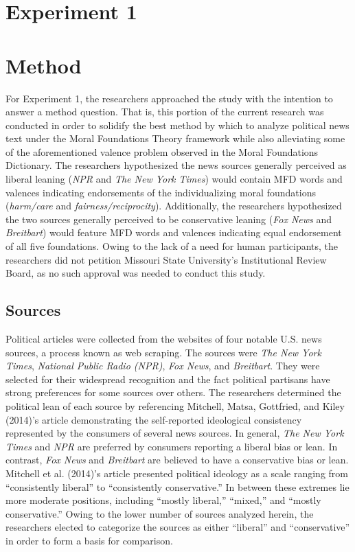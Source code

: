 \documentclass[english,,man]{apa6}
\begin{document}
\section{Experiment 1}\label{experiment-1}

\section{Method}\label{method}

For Experiment 1, the researchers approached the study with the
intention to answer a method question. That is, this portion of the
current research was conducted in order to solidify the best method by
which to analyze political news text under the Moral Foundations Theory
framework while also alleviating some of the aforementioned valence
problem observed in the Moral Foundations Dictionary. The researchers
hypothesized the news sources generally perceived as liberal leaning
(\emph{NPR} and \emph{The New York Times}) would contain MFD words and
valences indicating endorsements of the individualizing moral
foundations (\emph{harm/care} and \emph{fairness/reciprocity}).
Additionally, the researchers hypothesized the two sources generally
perceived to be conservative leaning (\emph{Fox News} and
\emph{Breitbart}) would feature MFD words and valences indicating equal
endorsement of all five foundations. Owing to the lack of a need for
human participants, the researchers did not petition Missouri State
University's Institutional Review Board, as no such approval was needed
to conduct this study.

\subsection{Sources}\label{sources}

Political articles were collected from the websites of four notable U.S.
news sources, a process known as web scraping. The sources were
\emph{The New York Times}, \emph{National Public Radio (NPR)}, \emph{Fox
News}, and \emph{Breitbart}. They were selected for their widespread
recognition and the fact political partisans have strong preferences for
some sources over others. The researchers determined the political lean
of each source by referencing Mitchell, Matsa, Gottfried, and Kiley
(2014)'s article demonstrating the self-reported ideological consistency
represented by the consumers of several news sources. In general,
\emph{The New York Times} and \emph{NPR} are preferred by consumers
reporting a liberal bias or lean. In contrast, \emph{Fox News} and
\emph{Breitbart} are believed to have a conservative bias or lean.
Mitchell et al. (2014)'s article presented political ideology as a scale
ranging from \enquote{consistently liberal} to \enquote{consistently
conservative.} In between these extremes lie more moderate positions,
including \enquote{mostly liberal,} \enquote{mixed,} and \enquote{mostly
conservative.} Owing to the lower number of sources analyzed herein, the
researchers elected to categorize the sources as either
\enquote{liberal} and \enquote{conservative} in order to form a basis
for comparison.
\end{document}
